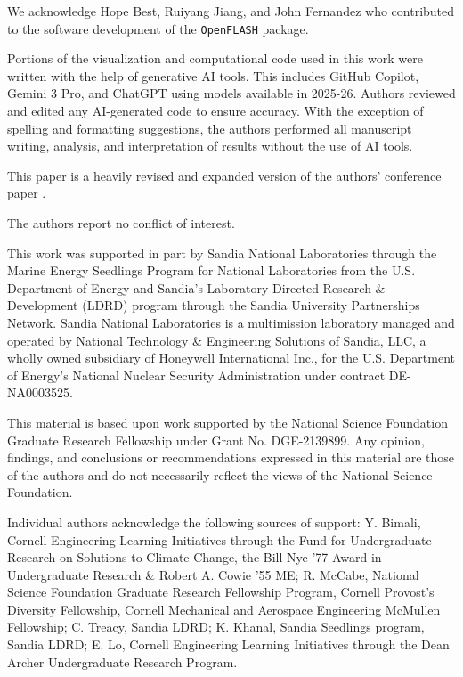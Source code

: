 \documentclass[lineno]{JFM-FLM_Au}
\begin{document}
    \begin{bmhead}[Acknowledgements.]
    We acknowledge Hope Best, Ruiyang Jiang, and John Fernandez who contributed to the software development of the \texttt{OpenFLASH} package.

    Portions of the visualization and computational code used in this work were written with the help of generative AI tools.
    This includes GitHub Copilot, Gemini 3 Pro, and ChatGPT using models available in 2025-26.
    Authors reviewed and edited any AI-generated code to ensure accuracy.
    With the exception of spelling and formatting suggestions, the authors performed all manuscript writing, analysis, and interpretation of results without the use of AI tools.

    This paper is a heavily revised and expanded version of the authors' conference paper \citet{mccabe_open-source_2024}.
    \end{bmhead}

    \begin{bmhead}
    The authors report no conflict of interest.
    \end{bmhead}

    \begin{bmhead}
    This work was supported in part by Sandia National Laboratories through the Marine Energy Seedlings Program for National Laboratories from the U.S. Department of Energy and Sandia's Laboratory Directed Research \& Development (LDRD) program through the Sandia University Partnerships Network. 
    Sandia National Laboratories is a multimission laboratory managed and operated by National Technology \& Engineering Solutions of Sandia, LLC, a wholly owned subsidiary of Honeywell International Inc., for the U.S. Department of Energy's National Nuclear Security Administration under contract DE-NA0003525.

    This material is based upon work supported by the National Science Foundation Graduate Research Fellowship under Grant No. DGE-2139899.
Any opinion, findings, and conclusions or recommendations expressed in this material are those of the authors and do not necessarily reflect the views of the National Science Foundation.

    Individual authors acknowledge the following sources of support:
    Y. Bimali, Cornell Engineering Learning Initiatives through the Fund for Undergraduate Research on Solutions to Climate Change, the Bill Nye '77 Award in Undergraduate Research \& Robert A. Cowie '55 ME;
    R. McCabe, National Science Foundation Graduate Research Fellowship Program, Cornell Provost's Diversity Fellowship, Cornell Mechanical and Aerospace Engineering McMullen Fellowship; 
    C. Treacy, Sandia LDRD; 
    K. Khanal, Sandia Seedlings program, Sandia LDRD; 
    E. Lo, Cornell Engineering Learning Initiatives through the Dean Archer Undergraduate Research Program.

    \end{bmhead}
\end{document}
